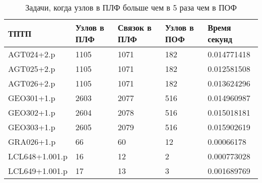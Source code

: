 \documentclass[a4paper]{jctart15b}
\begin{document}
\begin{table}[htbp]
	\caption{Задачи, когда узлов в ПЛФ больше чем в 5 раза чем в ПОФ}\vspace*{2mm}
	\begin{tabular}{|l|l|l|l|l|}
		\hline
		\textbf{ТПТП} & \textbf{Узлов в ПЛФ} & \textbf{Связок в ПЛФ} & \textbf{Узлов в ПОФ} & \textbf{Время секунд} \\
		\hline
		AGT024+2.p & 1105 & 1071 & 182 & 0.014771418 \\
		\hline
		AGT025+2.p & 1105 & 1071 & 182 & 0.012581508 \\
		\hline
		AGT026+2.p & 1105 & 1071 & 182 & 0.013624296 \\
		\hline
		GEO301+1.p & 2603 & 2077 & 516 & 0.014960987 \\
		\hline
		GEO302+1.p & 2604 & 2078 & 516 & 0.015018181 \\
		\hline
		GEO303+1.p & 2605 & 2079 & 516 & 0.015902619 \\
		\hline
		GRA026+1.p & 66 & 60 & 12 & 0.00066178 \\
		\hline
		LCL648+1.001.p & 16 & 12 & 2 & 0.000773028 \\
		\hline
		LCL649+1.001.p & 17 & 13 & 3 & 0.001689769 \\
		\hline

	\end{tabular}
\end{table}
\end{document}
